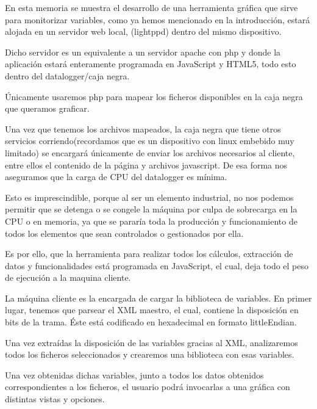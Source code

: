 
En esta memoria se muestra el desarrollo de una herramienta gráfica que sirve para monitorizar variables, como ya hemos mencionado en la introducción, estará alojada en un servidor web local, (lightppd) dentro del mismo dispositivo. 


Dicho servidor es un equivalente a un servidor apache con php y donde la aplicación estará enteramente programada en JavaScript y HTML5, todo esto dentro del datalogger/caja negra.


Únicamente usaremos php para mapear los ficheros disponibles en la caja negra que queramos graficar.


Una vez que tenemos los archivos mapeados, la caja negra que tiene otros servicios corriendo(recordamos que es un dispositivo con linux embebido muy limitado) se encargará únicamente de enviar los archivos necesarios al cliente, entre ellos el contenido de la página y archivos javascript. De esa forma nos aseguramos que la carga de CPU del datalogger es mínima. 


Esto es imprescindible, porque al ser un elemento industrial, no nos podemos permitir que se detenga o se congele la máquina por culpa de sobrecarga en la CPU o en memoria, ya que se pararía toda la producción y funcionamiento de todos los elementos que sean controlados o gestionados por ella.


Es por ello, que la herramienta para realizar todos los cálculos, extracción de datos y funcionalidades está programada en JavaScript, el cual, deja todo el peso de ejecución a la maquina cliente.


La máquina cliente es la encargada de cargar la biblioteca de variables. En primer lugar, tenemos que parsear el XML maestro, el cual, contiene la disposición en bits de la trama. Éste está codificado en hexadecimal en formato littleEndian.


Una vez extraídas la disposición de las variables gracias al XML, analizaremos todos los ficheros seleccionados y crearemos una biblioteca con esas variables.

Una vez obtenidas dichas variables, junto a todos los datos obtenidos correspondientes a los ficheros, el usuario podrá invocarlas a una gráfica con distintas vistas y opciones.


